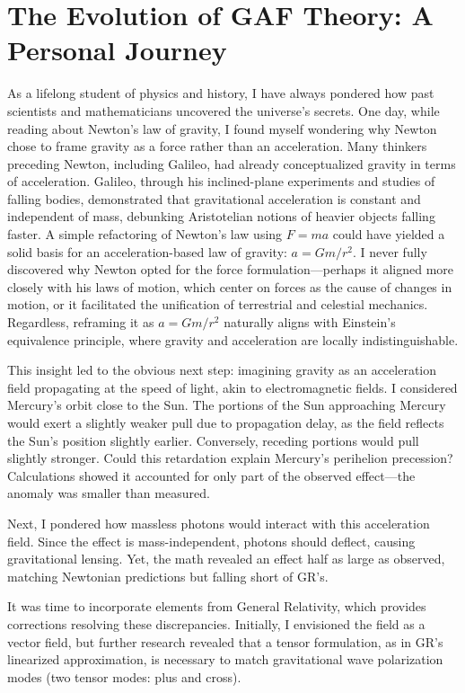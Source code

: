 \documentclass{article}
\begin{document}
\newpage
\section{The Evolution of GAF Theory: A Personal Journey}

As a lifelong student of physics and history, I have always pondered how past scientists and mathematicians uncovered the universe's secrets. One day, while reading about Newton's law of gravity, I found myself wondering why Newton chose to frame gravity as a force rather than an acceleration. Many thinkers preceding Newton, including Galileo, had already conceptualized gravity in terms of acceleration. Galileo, through his inclined-plane experiments and studies of falling bodies, demonstrated that gravitational acceleration is constant and independent of mass, debunking Aristotelian notions of heavier objects falling faster. A simple refactoring of Newton's law using \( F = ma \) could have yielded a solid basis for an acceleration-based law of gravity: \( a = G m / r^2 \). I never fully discovered why Newton opted for the force formulation—perhaps it aligned more closely with his laws of motion, which center on forces as the cause of changes in motion, or it facilitated the unification of terrestrial and celestial mechanics. Regardless, reframing it as \( a = G m / r^2 \) naturally aligns with Einstein's equivalence principle, where gravity and acceleration are locally indistinguishable.

This insight led to the obvious next step: imagining gravity as an acceleration field propagating at the speed of light, akin to electromagnetic fields. I considered Mercury's orbit close to the Sun. The portions of the Sun approaching Mercury would exert a slightly weaker pull due to propagation delay, as the field reflects the Sun's position slightly earlier. Conversely, receding portions would pull slightly stronger. Could this retardation explain Mercury's perihelion precession? Calculations showed it accounted for only part of the observed effect—the anomaly was smaller than measured.

Next, I pondered how massless photons would interact with this acceleration field. Since the effect is mass-independent, photons should deflect, causing gravitational lensing. Yet, the math revealed an effect half as large as observed, matching Newtonian predictions but falling short of GR's.

It was time to incorporate elements from General Relativity, which provides corrections resolving these discrepancies. Initially, I envisioned the field as a vector field, but further research revealed that a tensor formulation, as in GR's linearized approximation, is necessary to match gravitational wave polarization modes (two tensor modes: plus and cross).
\end{document}
